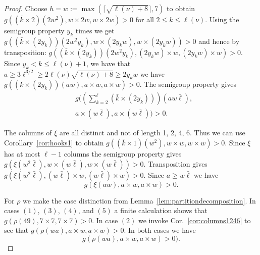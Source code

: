 \documentclass{article}
\numberwithin{equation}{section}
\theoremstyle{definition}
\begin{document}
\begin{proof}
Choose $h=w:=\max(\lceil\sqrt{\ell(\nu)+8}\rceil,7)$ to obtain
$
g((\bar k \times 2)(2w^2), w \times 2w, w \times 2w) > 0
$
for all $2 \leq k \leq \ell(\nu)$.
Using the semigroup property $y_k$ times we get
$
g((\bar k\times (2 y_k))(2w^2 y_k), w \times (2y_k w), w \times (2y_k w)) > 0
$
and hence by transposition:
$
g((\bar k\times (2 y_k))(2w^2 y_k), (2y_k w) \times w , (2y_k w) \times w ) > 0.
$
Since $y_k <k \leq \ell(\nu)+1$, we have that $a \geq 3\ell^{3/2} \geq 2\ell(\nu) \sqrt{\ell(\nu)+8} \geq2y_k w$ we have
$
g((\bar k\times (2 y_k))(a w), a \times w , a \times w ) > 0.
$
The semigroup property gives
\begin{equation}\label{eq:summandIII}
\begin{split}
&\textstyle g(( \sum_{k=2}^\ell (\bar k\times (2 y_k))  )(a w\bar\ell), \\
&a \times (w\bar\ell), a \times (w\bar\ell) ) > 0.
\end{split}
\end{equation}

The columns of $\xi$ are all distinct and not of length 1, 2, 4, 6.
Thus we can use Corollary~\ref{cor:hooks1} to obtain
$
g( (\bar k\times 1)(w^2), w \times w, w \times w) > 0.
$
Since $\xi$ has at most $\ell-1$ columns the semigroup property gives
$
g( \xi(w^2\bar\ell), w \times (w\bar\ell), w \times (w\bar\ell)) > 0.
$
Transposition gives
$
g( \xi(w^2\bar\ell), (w\bar\ell) \times w, (w\bar\ell) \times w) > 0.
$
Since $a \geq w\bar\ell$ we have
\begin{equation}\label{eq:summandIV}
g(\xi(aw), a \times w, a \times w) > 0.
\end{equation}

For $\rho$ we make the case distinction from Lemma~\ref{lem:partitiondecomposition}.
In cases $(1)$, $(3)$, $(4)$, and $(5)$ a finite calculation shows that $g(\rho(49),7\times 7,7\times 7)>0$.
In case $(2)$ we invoke Cor.~\ref{cor:columns1246} to see that
$g(\rho(wa),a\times w,a\times w)>0$.
In both cases we have
\begin{equation}\label{eq:summandV}
g(\rho(wa),a\times w,a\times w)>0).
\end{equation}


\end{proof}
\end{document}
